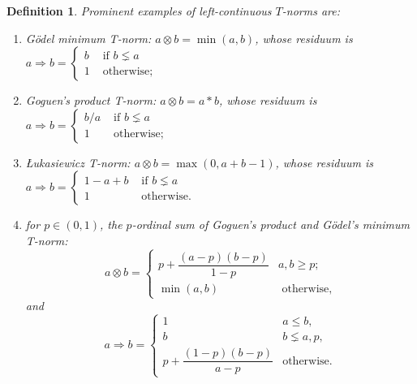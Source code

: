\documentclass{article}
\newtheorem{definition}{Definition}[section]
\begin{document}
\begin{definition}\label{norms}Prominent examples of left-continuous $T$-norms are:
\begin{enumerate}
    \item G\"odel minimum T-norm: $a\otimes b =\min(a,b)$, whose residuum is \\$a\Rightarrow b = \begin{cases}b & \mbox{ if } b\lneq a \\
1 &\mbox{ otherwise; } \end{cases}$
    \item Goguen's product T-norm: $a\otimes b =a*b$, whose residuum is \\
    $a\Rightarrow b = \begin{cases}b/a & \mbox{ if } b\lneq a \\
1 &\mbox{ otherwise; }
\end{cases}$
    \item {\L}ukasiewicz T-norm: $a\otimes b=\max(0, a+b-1)$, whose residuum is \\
 $a\Rightarrow b =\begin{cases}1-a+b & \mbox{ if } b\lneq a \\
1 &\mbox{ otherwise. }
\end{cases}$
\item for $p\in (0,1)$, the $p$-ordinal sum of Goguen's product and G\"odel's minimum T-norm:
$$a\otimes b=\begin{cases}p+ \dfrac{(a-p)(b-p)}{1-p} & a,b\geq p;\\ \min(a,b) & \mbox{ otherwise,}
\end{cases}$$ and 
$$a\Rightarrow b=\begin{cases}1& a\leq b,\\
b & b\lneq a,p, \\
p+ \dfrac{(1-p)(b-p)}{a-p} & \mbox{otherwise.}
\end{cases}$$

    \end{enumerate}
    \end{definition}
\end{document}
